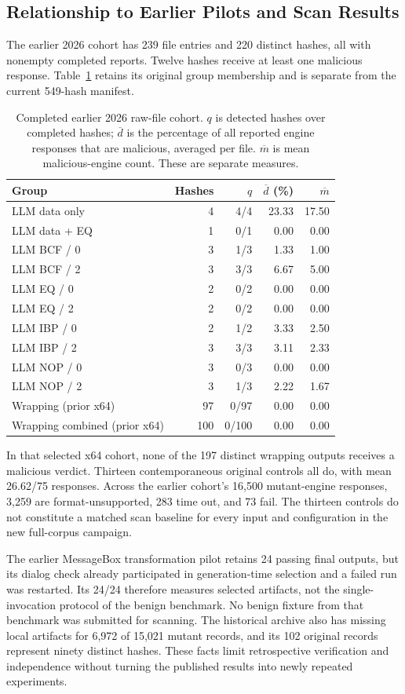 \subsection{Relationship to Earlier Pilots and Scan Results}
The earlier 2026 cohort has 239 file entries and 220 distinct hashes,
all with nonempty completed reports. Twelve hashes receive at least one
malicious response. Table~\ref{tab:new_vt_cohort} retains its original group
membership and is separate from the current 549-hash manifest.


\begin{table}[t]
\caption{Completed earlier 2026 raw-file cohort. $q$ is detected hashes
over completed hashes; $\overline d$ is the percentage of all reported
engine responses that are malicious, averaged per file. $\overline m$
is mean malicious-engine count. These are separate measures.}
\label{tab:new_vt_cohort}
\centering\small\setlength{\tabcolsep}{4pt}
\begin{tabular}{@{}lrrrr@{}}
\toprule
Group & Hashes & $q$ & $\overline d$ (\%) & $\overline m$ \\
\midrule
LLM data only & 4 & 4/4 & 23.33 & 17.50 \\
LLM data + EQ & 1 & 0/1 & 0.00 & 0.00 \\
LLM BCF / 0 & 3 & 1/3 & 1.33 & 1.00 \\
LLM BCF / 2 & 3 & 3/3 & 6.67 & 5.00 \\
LLM EQ / 0 & 2 & 0/2 & 0.00 & 0.00 \\
LLM EQ / 2 & 2 & 0/2 & 0.00 & 0.00 \\
LLM IBP / 0 & 2 & 1/2 & 3.33 & 2.50 \\
LLM IBP / 2 & 3 & 3/3 & 3.11 & 2.33 \\
LLM NOP / 0 & 3 & 0/3 & 0.00 & 0.00 \\
LLM NOP / 2 & 3 & 1/3 & 2.22 & 1.67 \\
Wrapping (prior x64) & 97 & 0/97 & 0.00 & 0.00 \\
Wrapping combined (prior x64) & 100 & 0/100 & 0.00 & 0.00 \\
\bottomrule
\end{tabular}
\end{table}


In that selected x64 cohort, none of the 197 distinct wrapping outputs
receives a malicious verdict. Thirteen contemporaneous original controls
all do, with mean 26.62/75 responses. Across the earlier cohort's 16,500
mutant-engine responses, 3,259 are format-unsupported, 283 time out, and
73 fail. The thirteen controls do not constitute a matched scan baseline
for every input and configuration in the new full-corpus campaign.

The earlier MessageBox transformation pilot retains 24 passing final
outputs, but its dialog check already participated in generation-time
selection and a failed run was restarted. Its 24/24 therefore measures
selected artifacts, not the single-invocation protocol of the benign
benchmark. No benign fixture from that benchmark was submitted for scanning.
The historical archive also has missing local artifacts for 6,972 of
15,021 mutant records, and its 102 original records represent ninety
distinct hashes. These facts limit retrospective verification and
independence without turning the published results into newly repeated
experiments.

